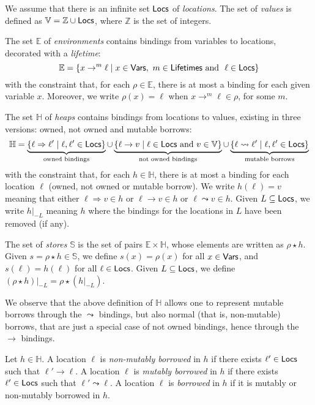 \begin{definition}
  We assume that there is an infinite set $\mathsf{Locs}$ of \emph{locations}.
  The set of \emph{values} is defined as $\mathbb{V}=\mathbb{Z}\cup\mathsf{Locs}$,
  where $\mathbb{Z}$ is the set of integers.

  The set $\mathbb{E}$
  of \emph{environments} contains bindings from variables to locations,
  decorated with a \emph{lifetime}:
  \[
  \mathbb{E}=\{x\to^m\ell\mid x\in\Vars,\ m\in\Lifetimes\text{ and }\ \ell\in\Locs\}
  \]
  with the constraint that, for each $\rho\in\mathbb{E}$, there is at most a binding for each
  given variable $x$. Moreover, we write $\rho(x)=\ell$ when
  $x\rightarrow^m\ell\in\rho$, for some $m$.

  The set $\mathbb{H}$ of \emph{heaps} contains bindings from locations to values,
  existing in three versions: owned, not owned and mutable borrows:
  \[
  \mathbb{H}=
  \underbrace{\{\ell\Rightarrow\ell'\mid\ell,\ell'\in\mathsf{Locs}\}}_{\text{owned bindings}}
  \cup
  \underbrace{\{\ell\rightarrow v\mid\ell\in\mathsf{Locs}\text{ and }v\in\mathbb{V}\}}_{\text{not owned bindings}}
  \cup
  \underbrace{\{\ell\leadsto\ell'\mid\ell,\ell'\in\mathsf{Locs}\}}_{\text{mutable borrows}}
  \]
  with the constraint that, for each $h\in\mathbb{H}$, there is at most a binding for each
  location $\ell$ (owned, not owned or mutable borrow). We write $h(\ell)=v$ meaning that
  either $\ell\Rightarrow v\in h$ or $\ell\rightarrow v\in h$ or $\ell\leadsto v\in h$.
  Given $L\subseteq\mathsf{Locs}$,
  we write $h|_{-L}$ meaning $h$ where the bindings for the locations in $L$
  have been removed (if any).

  The set of \emph{stores} $\mathbb{S}$ is the set of pairs
  $\mathbb{E}\times\mathbb{H}$, whose elements are written as $\rho\star h$.
  Given $s=\rho\star h\in\mathbb{S}$, we define $s(x)=\rho(x)$ for all
  $x\in\mathsf{Vars}$, and $s(\ell)=h(\ell)$ for all $\ell\in\mathsf{Locs}$.
  Given $L\subseteq\mathsf{Locs}$, we define $(\rho\star h)|_{-L}=\rho\star(h|_{-L})$.
\end{definition}

\noindent
We observe that the above definition of $\mathbb{H}$ allows one to represent mutable borrows
through the $\leadsto$ bindings, but also normal (that is, non-mutable) borrows, that are
just a special case of not owned bindings, hence through the $\to$ bindings.

\begin{definition}
  Let $h\in\mathbb{H}$. %
  A location $\ell$ is \emph{non-mutably borrowed} in $h$
  if there exists $\ell'\in\mathsf{Locs}$ such that $\ell'\to\ell$.
  A location $\ell$ is \emph{mutably borrowed} in $h$
  if there exists $\ell'\in\mathsf{Locs}$ such that $\ell'\leadsto\ell$.
  A location $\ell$ is \emph{borrowed} in $h$
  if it is mutably or non-mutably borrowed in $h$.
\end{definition}

